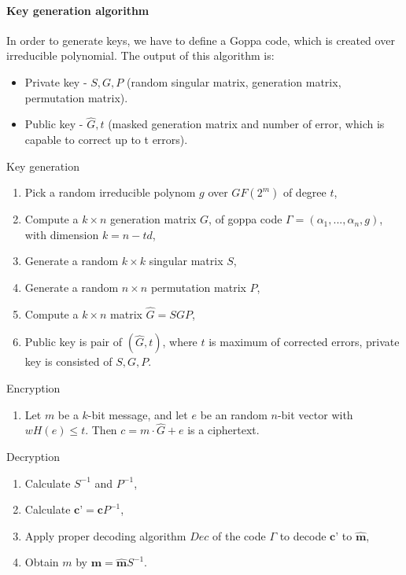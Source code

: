\paragraph{Key generation algorithm} %
\label{par:generovanie_k_ov_ho_p_ru}
In order to generate keys, we have to define a Goppa code, which is created over irreducible polynomial. The output of this algorithm is: 
\begin{itemize}
	\item Private key - $S,G,P$ (random singular matrix, generation matrix, permutation matrix). \item Public key - $\widehat{G},t$ (masked generation matrix and number of error, which is capable to correct up to t errors).
\end{itemize} 


\begin{algorithm}[H]
	\caption{Key generation}
	\label{Key_gen}
	\begin{enumerate}
		\item Pick a random irreducible polynom $g$ over $GF(2^m)$ of degree $t$,
		\item Compute a $k \times n$ generation matrix $G$, of goppa code $\Gamma=(\alpha_1,...,\alpha_n,g)$, with dimension $k=n-td$,
		\item Generate a random $k \times k$ singular matrix $S$,
		\item Generate a random $n \times n$ permutation matrix $P$,
		\item Compute a $k \times n$ matrix $\widehat{G}=SGP$,
		\item Public key is pair of $(\widehat{G},t)$, where $t$ is maximum of corrected errors, private key is consisted of $S,G,P$.
	\end{enumerate}
\end{algorithm}

\begin{algorithm}[H]
	\caption{Encryption}
	\label{mecs_keygen}
	\begin{enumerate}
		\item Let $m$ be a $k$-bit message, and let $e$ be an random $n$-bit vector
		with $wH(e) \le t$. Then $c = m \cdot \widehat{G} + e$ is a ciphertext.
	\end{enumerate}
\end{algorithm}

\begin{algorithm}[H]
	\caption{Decryption}
	\label{mecs_keygen}
 	\begin{enumerate}
 		\item Calculate  $S^{-1}$ and $P^{-1}$,
 		\item Calculate $\textbf{c'}=\textbf{c}P^{-1}$,
 		\item Apply proper decoding algorithm $Dec$ of the code $\Gamma$ to decode $\textbf{c'}$ to $\widehat{\textbf{m}}$,
 		\item Obtain $m$ by  $\textbf{m}=\widehat{\textbf{m}}S^{-1}$.
 	\end{enumerate}
\end{algorithm}


